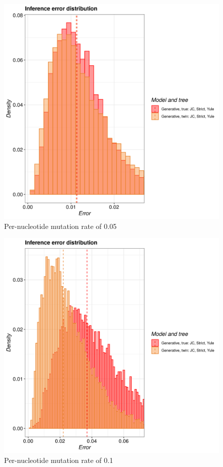 \begin{figure}[H]
  \includegraphics[width=\textwidth]{pirouette_example_24/example_24_316/errors.png}
  \caption{Per-nucleotide mutation rate of 0.05}
\end{figure}

\begin{figure}[H]
  \includegraphics[width=\textwidth]{pirouette_example_24/example_24_317/errors.png}
  \caption{Per-nucleotide mutation rate of 0.1}
\end{figure}

